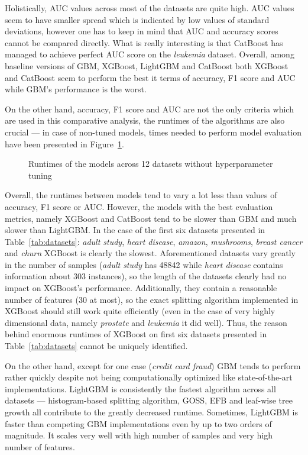 \documentclass[magisterska, english]{pwr_wmat_praca_dyplomowa}
\theoremstyle{plain}
\numberwithin{theorem}{chapter}
\theoremstyle{definition}
\numberwithin{theorem}{chapter}
\begin{document}
Holistically, AUC values across most of the datasets are quite high. AUC values seem to have smaller spread which is indicated by low values of standard deviations, however one has to keep in mind that AUC and accuracy scores cannot be compared directly. What is really interesting is that CatBoost has managed to achieve perfect AUC score on the \emph{leukemia} dataset. Overall, among baseline versions of GBM, XGBoost, LightGBM and CatBoost both XGBoost and CatBoost seem to perform the best it terms of accuracy, F1 score and AUC while GBM's performance is the worst.

On the other hand, accuracy, F1 score and AUC are not the only criteria which are used in this comparative analysis, the runtimes of the algorithms are also crucial --- in case of non-tuned models, times needed to perform model evaluation have been presented in Figure~\ref{fig:no_tuning_runtimes}.

\begin{figure}[H]
	\centering
	\caption{Runtimes of the models across 12 datasets without hyperparameter tuning}
	\label{fig:no_tuning_runtimes}
\end{figure}

Overall, the runtimes between models tend to vary a lot less than values of accuracy, F1 score or AUC. However, the models with the best evaluation metrics, namely XGBoost and CatBoost tend to be slower than GBM and much slower than LightGBM. In the case of the first six datasets presented in Table~\ref{tab:datasets}: \emph{adult study}, \emph{heart disease}, \emph{amazon}, \emph{mushrooms}, \emph{breast cancer} and \emph{churn} XGBoost is clearly the slowest. Aforementioned datasets vary greatly in the number of samples (\emph{adult study} has 48842 while \emph{heart disease} contains information about 303 instances), so the length of the datasets clearly had no impact on XGBoost's performance. Additionally, they contain a reasonable number of features (30 at most), so the exact splitting algorithm implemented in XGBoost should still work quite efficiently (even in the case of very highly dimensional data, namely \emph{prostate} and \emph{leukemia} it did well). Thus, the reason behind enormous runtimes of XGBoost on first six datasets presented in Table~\ref{tab:datasets} cannot be uniquely identified.

On the other hand, except for one case (\emph{credit card fraud}) GBM tends to perform rather quickly despite not being computationally optimized like state-of-the-art implementations. LightGBM is consistently the fastest algorithm across all datasets --- histogram-based splitting algorithm, GOSS, EFB and leaf-wise tree growth all contribute to the greatly decreased runtime. Sometimes, LightGBM is faster than competing GBM implementations even by up to two orders of magnitude. It scales very well with high number of samples and very high number of features.
\end{document}
